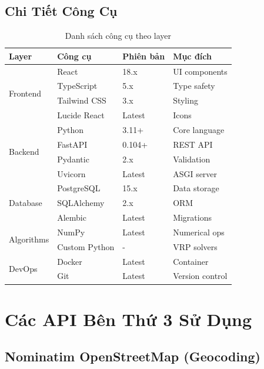 \documentclass[12pt,a4paper,openany,oneside]{report}
\begin{document}
\subsection{Chi Tiết Công Cụ}

\begin{table}[h]
\centering
\caption{Danh sách công cụ theo layer}
\begin{tabular}{@{}llll@{}}
\toprule
\textbf{Layer} & \textbf{Công cụ} & \textbf{Phiên bản} & \textbf{Mục đích} \\
\midrule
\multirow{4}{*}{Frontend} 
    & React & 18.x & UI components \\
    & TypeScript & 5.x & Type safety \\
    & Tailwind CSS & 3.x & Styling \\
    & Lucide React & Latest & Icons \\
\midrule
\multirow{4}{*}{Backend} 
    & Python & 3.11+ & Core language \\
    & FastAPI & 0.104+ & REST API \\
    & Pydantic & 2.x & Validation \\
    & Uvicorn & Latest & ASGI server \\
\midrule
\multirow{3}{*}{Database} 
    & PostgreSQL & 15.x & Data storage \\
    & SQLAlchemy & 2.x & ORM \\
    & Alembic & Latest & Migrations \\
\midrule
\multirow{2}{*}{Algorithms} 
    & NumPy & Latest & Numerical ops \\
    & Custom Python & - & VRP solvers \\
\midrule
\multirow{2}{*}{DevOps} 
    & Docker & Latest & Container \\
    & Git & Latest & Version control \\
\bottomrule
\end{tabular}
\end{table}

\section{Các API Bên Thứ 3 Sử Dụng}

\subsection{Nominatim OpenStreetMap (Geocoding)}
\end{document}
